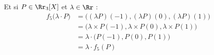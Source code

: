 {{Et si $P\in \Rr_3[X]$ et $\lambda \in \Rr$ :
\begin{align*}
f_5\big( \lambda \cdot P\big) 
  & =  \big( (\lambda P)(-1), (\lambda P)(0), (\lambda P)(1) \big) \\
  & = \big( \lambda \times P(-1), \lambda \times P(0), \lambda \times P(1) \big) \\
  & = \lambda \cdot \big( P(-1), P(0), P(1) \big) \\
  & = \lambda \cdot f_5(P) \\
\end{align*}
}
}
